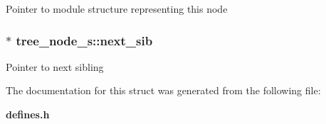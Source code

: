 Pointer to module structure representing this node 
\subsubsection{$\ast$ tree\_\-node\_\-s::next\_\-sib}\label{structtree__node__s_m3}


Pointer to next sibling 

The documentation for this struct was generated from the following file:\begin{CompactItemize}
\item 
{\bf defines.h}\end{CompactItemize}
